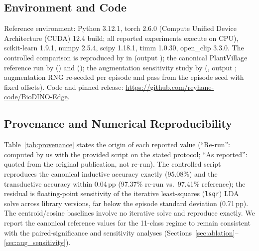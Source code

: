 \documentclass[preprint,12pt]{elsarticle}
\begin{document}
\subsection{Environment and Code}
Reference environment: Python 3.12.1, torch 2.6.0 (Compute Unified Device Architecture (CUDA) 12.4 build; all reported experiments execute on CPU), scikit-learn 1.9.1, numpy 2.5.4, scipy 1.18.1, timm 1.0.30, open\_clip 3.3.0. The controlled comparison is reproduced by  in  (output ); the canonical PlantVillage reference run by  () and  (); the augmentation sensitivity study by  (, output ; augmentation RNG re-seeded per episode and pass from the episode seed with fixed offsets). Code and pinned release: \url{https://github.com/reyhane-code/BioDINO-Edge}.

\subsection{Provenance and Numerical Reproducibility}
Table~\ref{tab:provenance} states the origin of each reported value (``Re-run'': computed by us with the provided script on the stated protocol; ``As reported'': quoted from the original publication, not re-run). The controlled script reproduces the canonical inductive accuracy exactly (95.08\%) and the transductive accuracy within 0.04\,pp (97.37\% re-run vs.\ 97.41\% reference); the residual is floating-point sensitivity of the iterative least-squares (\texttt{lsqr}) LDA solve across library versions, far below the episode standard deviation (0.71\,pp). The centroid/cosine baselines involve no iterative solve and reproduce exactly. We report the canonical reference values for the 11-class regime to remain consistent with the paired-significance and sensitivity analyses (Sections~\ref{sec:ablation}--\ref{sec:aug_sensitivity}).
\end{document}
